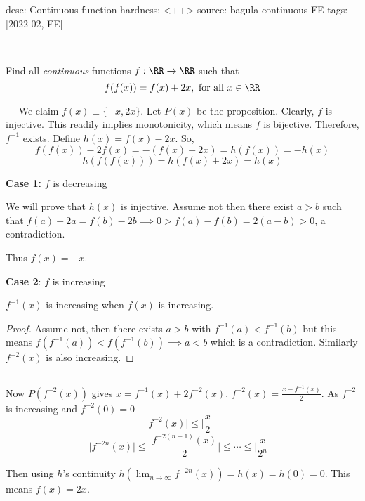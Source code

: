 desc: Continuous function
hardness: <++>
source: bagula continuous FE
tags: [2022-02, FE]

---

Find all \textit{continuous} functions $f:\RR \to \RR$ such that
\[
  f(f(x)) = f(x) + 2x, \text{ for all } x \in \RR
\]

---
  We claim $f(x) \equiv \{-x,2x\}$. Let $P(x)$ be the proposition.
  Clearly, $f$ is injective. This readily implies monotonicity, which means $f$ is bijective. 
  Therefore, $f^{-1}$ exists. 
  Define $h(x) = f(x) - 2x$. So, 
  \[f(f(x)) - 2f(x) = -(f(x) - 2x) = h(f(x)) = -h(x)\]
  \[h(f(f(x))) = h(f(x) + 2x) = h(x)\]

  \textbf{Case 1:} $f$ is decreasing

  We will prove that $h(x)$ is injective. Assume not then there exist $a>b$
  such that $f(a) -2a =f(b) - 2b \implies 0 > f(a) - f(b) = 2(a-b) > 0$, a contradiction. 

  Thus $\boxed{f(x) = -x}$.

\smallskip
  \textbf{Case 2}: $f$ is increasing

  \begin{claim*}
  $f^{-1}(x)$ is increasing when $f(x)$ is increasing.  
  \end{claim*}
  \begin{proof}
    
  Assume not, 
  then there exists $a > b$ with $f^{-1}(a) < f^{-1}(b)$ but this means 
  $f(f^{-1}(a)) < f(f^{-1}(b)) \implies a < b$ which is a contradiction. Similarly
  $f^{-2}(x)$ is also increasing.
  \end{proof}
\smallskip
\hrule
\smallskip
  Now $P(f^{-2}(x))$ gives $x = f^{-1}(x) + 2f^{-2}(x)$.
  $f^{-2}(x) = \frac{x-f^{-1}(x)}{2}$. 
  As $f^{-2}$ is increasing and $f^{-2}(0) = 0$
  \[\mid f^{-2}(x)\mid \leq \mid\frac{x}{2}\mid\]
  \[\mid f^{-2n}(x)\mid \leq \mid\frac{f^{-2(n-1)}(x)}{2}\mid \leq \cdots \leq \mid\frac{x}{2^n}\mid\]
  
  Then using $h$'s continuity $h\displaystyle \left( \lim_{n \to \infty}f^{-2n}(x) \right) = h(x) = h(0) = 0$. 
  This means $\boxed{f(x) = 2x}$.
